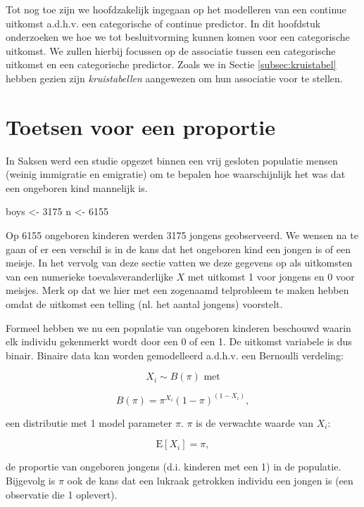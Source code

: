 \documentclass[
  12pt,dutch,coursenotes]{book}
\newenvironment{Shaded}{\begin{snugshade}}{\end{snugshade}}
\newcommand{\DecValTok}[1]{\textcolor[rgb]{0.00,0.00,0.81}{#1}}
\newcommand{\NormalTok}[1]{#1}
\newcommand{\StringTok}[1]{\textcolor[rgb]{0.31,0.60,0.02}{#1}}
\theoremstyle{definition}
\theoremstyle{definition}
\theoremstyle{definition}
\theoremstyle{remark}
\begin{document}
Tot nog toe zijn we hoofdzakelijk ingegaan op het modelleren van een continue uitkomst a.d.h.v. een categorische of continue predictor.
In dit hoofdstuk onderzoeken we hoe we tot besluitvorming kunnen komen voor een categorische uitkomst.
We zullen hierbij focussen op de associatie tussen een categorische uitkomst en een categorische predictor.
Zoals we in Sectie \ref{subsec:kruistabel} hebben gezien zijn \emph{kruistabellen} aangewezen om hun associatie voor te stellen.

\hypertarget{toetsen-voor-een-proportie}{%
\section{Toetsen voor een proportie}\label{toetsen-voor-een-proportie}}

In Saksen werd een studie opgezet binnen een vrij gesloten populatie mensen (weinig immigratie en emigratie) om te bepalen hoe waarschijnlijk het was dat een ongeboren kind mannelijk is.

\begin{Shaded}
\begin{Highlighting}[]
\NormalTok{boys \textless{}{-}}\StringTok{ }\DecValTok{3175}
\NormalTok{n \textless{}{-}}\StringTok{ }\DecValTok{6155}
\end{Highlighting}
\end{Shaded}

Op 6155 ongeboren kinderen werden 3175 jongens
geobserveerd.
We wensen na te gaan of er een verschil is in de kans dat het ongeboren kind een jongen is of een meisje.
In het vervolg van deze sectie vatten we deze gegevens op als uitkomsten van een numerieke toevalsveranderlijke \(X\) met uitkomst 1 voor jongens en 0 voor meisjes.
Merk op dat we hier met een zogenaamd telprobleem te maken hebben omdat de uitkomst een telling (nl. het aantal jongens) voorstelt.

Formeel hebben we nu een populatie van ongeboren kinderen beschouwd
waarin elk individu gekenmerkt wordt door een 0 of een 1.
De uitkomst variabele is dus binair.
Binaire data kan worden gemodelleerd a.d.h.v. een Bernoulli verdeling:

\[X_i \sim B(\pi) \text{ met}\]

\[B(\pi)=\pi^{X_i}(1-\pi)^{(1-X_i)},\]

een distributie met 1 model parameter \(\pi\).
\(\pi\) is de verwachte waarde van \(X_i\):

\[\text{E}[X_i]=\pi,\]

de proportie van ongeboren jongens (d.i. kinderen met een 1) in
de populatie.
Bijgevolg is \(\pi\) ook de kans dat een lukraak getrokken individu een jongen is (een observatie die 1 oplevert).
\end{document}
